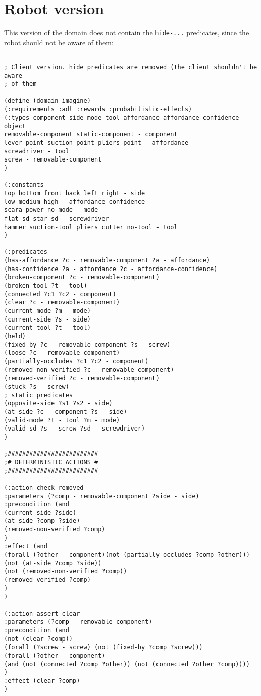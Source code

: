 \documentclass[../root.tex]{subfiles}
\begin{document}
\section{Robot version}

This version of the domain does not contain the \texttt{hide-...}
predicates, since the robot should not be aware of them:

\begin{lstlisting}

; Client version. hide predicates are removed (the client shouldn't be aware
; of them

(define (domain imagine)
(:requirements :adl :rewards :probabilistic-effects)
(:types component side mode tool affordance affordance-confidence - object
removable-component static-component - component
lever-point suction-point pliers-point - affordance
screwdriver - tool
screw - removable-component
)

(:constants
top bottom front back left right - side
low medium high - affordance-confidence
scara power no-mode - mode
flat-sd star-sd - screwdriver
hammer suction-tool pliers cutter no-tool - tool
)

(:predicates
(has-affordance ?c - removable-component ?a - affordance)
(has-confidence ?a - affordance ?c - affordance-confidence)
(broken-component ?c - removable-component)
(broken-tool ?t - tool)
(connected ?c1 ?c2 - component)
(clear ?c - removable-component)
(current-mode ?m - mode)
(current-side ?s - side)
(current-tool ?t - tool)
(held)
(fixed-by ?c - removable-component ?s - screw)
(loose ?c - removable-component)
(partially-occludes ?c1 ?c2 - component)
(removed-non-verified ?c - removable-component)
(removed-verified ?c - removable-component)
(stuck ?s - screw)
; static predicates
(opposite-side ?s1 ?s2 - side)
(at-side ?c - component ?s - side)
(valid-mode ?t - tool ?m - mode)
(valid-sd ?s - screw ?sd - screwdriver)
)

;#########################
;# DETERMINISTIC ACTIONS #
;#########################

(:action check-removed
:parameters (?comp - removable-component ?side - side)
:precondition (and
(current-side ?side)
(at-side ?comp ?side)
(removed-non-verified ?comp)
)
:effect (and
(forall (?other - component)(not (partially-occludes ?comp ?other)))
(not (at-side ?comp ?side))
(not (removed-non-verified ?comp))
(removed-verified ?comp)
)
)

(:action assert-clear
:parameters (?comp - removable-component)
:precondition (and
(not (clear ?comp))
(forall (?screw - screw) (not (fixed-by ?comp ?screw)))
(forall (?other - component)
(and (not (connected ?comp ?other)) (not (connected ?other ?comp))))
)
:effect (clear ?comp)
)


\end{lstlisting}
\end{document}
